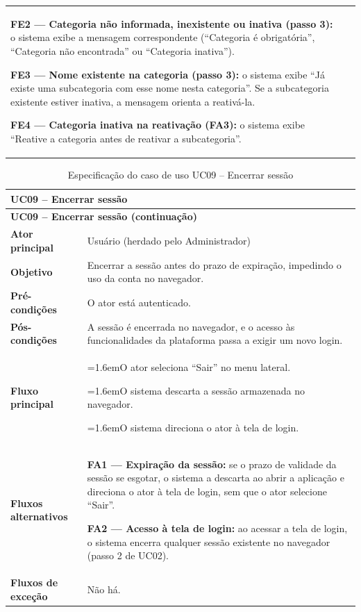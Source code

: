 \documentclass[12pt,a4paper]{article}
\newcommand{\ucitem}[2]{\par\noindent\hangindent=1.6em\hangafter=1\makebox[1.6em][l]{#1}#2}
\begin{document}
\begin{longtable}{|p{}|p{}|}
\par\smallskip\noindent \textbf{FE2 — Categoria não informada, inexistente ou inativa (passo 3):} o sistema exibe a mensagem correspondente (``Categoria é obrigatória'', ``Categoria não encontrada'' ou ``Categoria inativa'').
\par\smallskip\noindent \textbf{FE3 — Nome existente na categoria (passo 3):} o sistema exibe ``Já existe uma subcategoria com esse nome nesta categoria''. Se a subcategoria existente estiver inativa, a mensagem orienta a reativá-la.
\par\smallskip\noindent \textbf{FE4 — Categoria inativa na reativação (FA3):} o sistema exibe ``Reative a categoria antes de reativar a subcategoria''. \\
\end{longtable}




\begin{longtable}{|p{}|p{}|}
\caption{Especificação do caso de uso UC09 -- Encerrar sessão}
\label{tab:uc09} \\
\hline
\multicolumn{2}{|l|}{\textbf{UC09 -- Encerrar sessão}} \\
\hline
\endfirsthead

\hline
\multicolumn{2}{|l|}{\textbf{UC09 -- Encerrar sessão (continuação)}} \\
\hline
\endhead

\hline
\endfoot
\textbf{Ator principal} & Usuário (herdado pelo Administrador) \\ \hline
\textbf{Objetivo} & Encerrar a sessão antes do prazo de expiração, impedindo o uso da conta no navegador. \\ \hline
\textbf{Pré-condições} & O ator está autenticado. \\ \hline
\textbf{Pós-condições} & A sessão é encerrada no navegador, e o acesso às funcionalidades da plataforma passa a exigir um novo login. \\ \hline
\textbf{Fluxo principal} &
\ucitem{1.}{O ator seleciona ``Sair'' no menu lateral.}
\ucitem{2.}{O sistema descarta a sessão armazenada no navegador.}
\ucitem{3.}{O sistema direciona o ator à tela de login.} \\ \hline
\textbf{Fluxos alternativos} &
\noindent \textbf{FA1 — Expiração da sessão:} se o prazo de validade da sessão se esgotar, o sistema a descarta ao abrir a aplicação e direciona o ator à tela de login, sem que o ator selecione ``Sair''.
\par\smallskip\noindent \textbf{FA2 — Acesso à tela de login:} ao acessar a tela de login, o sistema encerra qualquer sessão existente no navegador (passo 2 de UC02). \\ \hline
\textbf{Fluxos de exceção} &
\noindent Não há. \\
\end{longtable}
\end{document}
